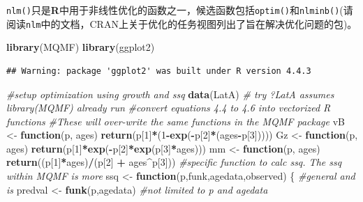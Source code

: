 \documentclass[
  lang=cn,
  11pt,
  scheme=chinese,
  chinesefont=nofont,
  citestyle=gb7714-2015,
  bibstyle=gb7714-2015]{elegantbook}
\newenvironment{Shaded}{\begin{snugshade}}{\end{snugshade}}
\newcommand{\CommentTok}[1]{\textcolor[rgb]{0.56,0.35,0.01}{\textit{#1}}}
\newcommand{\ControlFlowTok}[1]{\textcolor[rgb]{0.13,0.29,0.53}{\textbf{#1}}}
\newcommand{\DecValTok}[1]{\textcolor[rgb]{0.00,0.00,0.81}{#1}}
\newcommand{\FunctionTok}[1]{\textcolor[rgb]{0.13,0.29,0.53}{\textbf{#1}}}
\newcommand{\NormalTok}[1]{#1}
\newcommand{\OtherTok}[1]{\textcolor[rgb]{0.56,0.35,0.01}{#1}}
\newcommand{\SpecialCharTok}[1]{\textcolor[rgb]{0.81,0.36,0.00}{\textbf{#1}}}
\begin{document}
\texttt{nlm()}只是\textbf{R}中用于非线性优化的函数之一，候选函数包括\texttt{optim()}和\texttt{nlminb()}(请阅读\texttt{nlm}中的文档，CRAN上关于优化的任务视图列出了旨在解决优化问题的包)。

\begin{Shaded}
\begin{Highlighting}[]
\FunctionTok{library}\NormalTok{(MQMF)}
\FunctionTok{library}\NormalTok{(ggplot2)}
\end{Highlighting}
\end{Shaded}

\begin{verbatim}
## Warning: package 'ggplot2' was built under R version 4.4.3
\end{verbatim}

\begin{Shaded}
\begin{Highlighting}[]
 \CommentTok{\#setup optimization using growth and ssq  }
\FunctionTok{data}\NormalTok{(LatA)      }\CommentTok{\# try ?LatA   assumes library(MQMF) already run  }
 \CommentTok{\#convert equations 4.4 to 4.6 into vectorized R functions  }
 \CommentTok{\#These will over{-}write the same functions in the MQMF package  }
\NormalTok{vB }\OtherTok{\textless{}{-}} \ControlFlowTok{function}\NormalTok{(p, ages) }\FunctionTok{return}\NormalTok{(p[}\DecValTok{1}\NormalTok{]}\SpecialCharTok{*}\NormalTok{(}\DecValTok{1}\SpecialCharTok{{-}}\FunctionTok{exp}\NormalTok{(}\SpecialCharTok{{-}}\NormalTok{p[}\DecValTok{2}\NormalTok{]}\SpecialCharTok{*}\NormalTok{(ages}\SpecialCharTok{{-}}\NormalTok{p[}\DecValTok{3}\NormalTok{]))))  }
\NormalTok{Gz }\OtherTok{\textless{}{-}} \ControlFlowTok{function}\NormalTok{(p, ages) }\FunctionTok{return}\NormalTok{(p[}\DecValTok{1}\NormalTok{]}\SpecialCharTok{*}\FunctionTok{exp}\NormalTok{(}\SpecialCharTok{{-}}\NormalTok{p[}\DecValTok{2}\NormalTok{]}\SpecialCharTok{*}\FunctionTok{exp}\NormalTok{(p[}\DecValTok{3}\NormalTok{]}\SpecialCharTok{*}\NormalTok{ages)))  }
\NormalTok{mm }\OtherTok{\textless{}{-}} \ControlFlowTok{function}\NormalTok{(p, ages) }\FunctionTok{return}\NormalTok{((p[}\DecValTok{1}\NormalTok{]}\SpecialCharTok{*}\NormalTok{ages)}\SpecialCharTok{/}\NormalTok{(p[}\DecValTok{2}\NormalTok{] }\SpecialCharTok{+}\NormalTok{ ages}\SpecialCharTok{\^{}}\NormalTok{p[}\DecValTok{3}\NormalTok{]))  }
 \CommentTok{\#specific function to calc ssq. The ssq within MQMF is more  }
\NormalTok{ssq }\OtherTok{\textless{}{-}} \ControlFlowTok{function}\NormalTok{(p,funk,agedata,observed) \{        }\CommentTok{\#general and is  }
\NormalTok{  predval }\OtherTok{\textless{}{-}} \FunctionTok{funk}\NormalTok{(p,agedata)        }\CommentTok{\#not limited to p and agedata  }

\end{Highlighting}
\end{Shaded}
\end{document}
